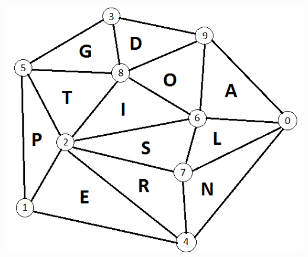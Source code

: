 \documentclass[12pt]{article}
\begin{document}
\begin{center}
\includegraphics[scale=1.0]{meta2-graphic-final.png}
\end{center}
\end{document}
